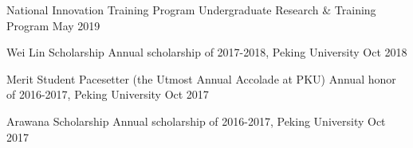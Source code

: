 \begin{cvhonors}
\cvhonor
{National Innovation Training Program} %
{Undergraduate Research \& Training Program} %
{May 2019} %




\cvhonor
{Wei Lin Scholarship } %
{Annual scholarship of 2017-2018, Peking University} %
{Oct 2018} %


\cvhonor
{Merit Student Pacesetter (the Utmost Annual Accolade at PKU)} %
{Annual honor of 2016-2017, Peking University} %
{Oct 2017} %


\cvhonor
{Arawana Scholarship} %
{Annual scholarship of 2016-2017, Peking University} %
{Oct 2017} %





\end{cvhonors}
